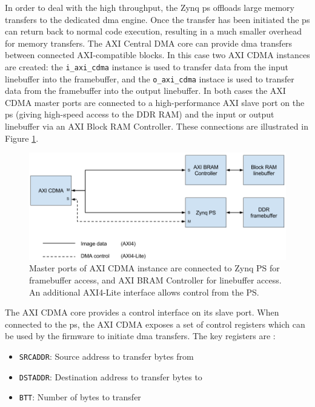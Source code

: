 In order to deal with the high throughput, the Zynq \gls{ps} offloads large memory transfers to the dedicated \gls{dma} engine. Once the transfer has been initiated the \gls{ps} can return back to normal code execution, resulting in a much smaller overhead for memory transfers. The AXI Central DMA core can provide \gls{dma} transfers between connected AXI-compatible blocks. In this case two AXI CDMA instances are created: the \texttt{i\_axi\_cdma} instance is used to transfer data from the input linebuffer into the framebuffer, and the \texttt{o\_axi\_cdma} instace is used to transfer data from the framebuffer into the output linebuffer. In both cases the AXI CDMA master ports are connected to a high-performance AXI slave port on the \gls{ps} (giving high-speed access to the DDR RAM) and the input or output linebuffer via an AXI Block RAM Controller. These connections are illustrated in Figure \ref{fig:axi_cdma}.

\begin{figure}
  \centering
  \includegraphics[width=1\textwidth]{./img/axi_cdma.png}
  \caption[AXI CDMA connection diagram.]{Master ports of AXI CDMA instance are connected to Zynq PS for framebuffer access, and AXI BRAM Controller for linebuffer access. An additional AXI4-Lite interface allows control from the PS.}
  \label{fig:axi_cdma}
\end{figure}

The AXI CDMA core provides a control interface on its slave port. When connected to the \gls{ps}, the AXI CDMA exposes a set of control registers which can be used by the firmware to initiate \gls{dma} transfers. The key registers are \cite{xilinx:pg034}:
\begin{itemize}
  \item \texttt{SRCADDR}: Source address to transfer bytes from
  \item \texttt{DSTADDR}: Destination address to transfer bytes to 
  \item \texttt{BTT}: Number of bytes to transfer
\end{itemize}

